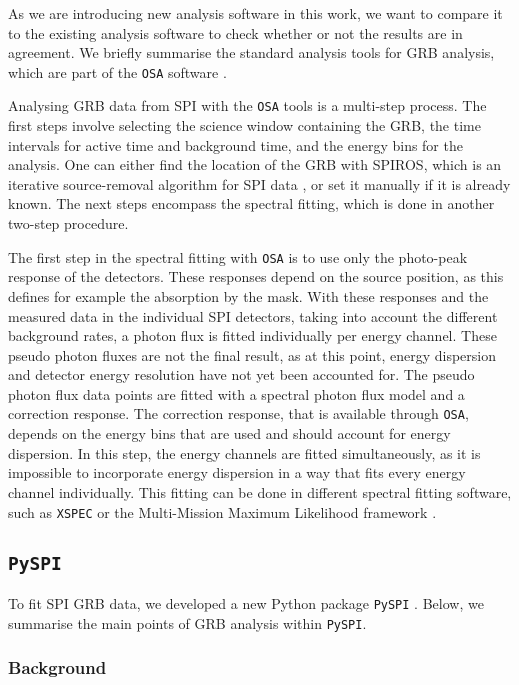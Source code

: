 \documentclass{aa}
\begin{document}
As we are introducing new analysis software in this work, we want to compare it to the existing analysis software to check whether or not the results are in agreement. We briefly summarise the standard analysis tools for GRB analysis, which are part of the {\tt OSA} software \citep{osa}.

Analysing GRB data from SPI with the {\tt OSA} tools is a multi-step process. The first steps involve selecting the science window containing the GRB, the time intervals for active time and background time, and the energy bins for the analysis. One can either find the location of the GRB with SPIROS, which is an iterative source-removal algorithm for SPI data \citep{Skinner-2003}, or set it manually if it is already known. The next steps encompass the spectral fitting, which is done in another two-step procedure.

The first step in the spectral fitting with {\tt OSA} is to use only the photo-peak response of the detectors. These responses depend on the source position, as this defines for example the absorption by the mask. With these responses and the measured data in the individual SPI detectors, taking into account the different background rates, a photon flux is fitted individually per energy channel. These pseudo photon fluxes are not the final result, as at this point, energy dispersion and detector energy resolution have not yet been accounted for.
The pseudo photon flux data points are fitted with a spectral photon flux model and a correction response. The correction response, that is available through {\tt OSA}, depends on the energy bins that are used and should account for energy dispersion. In this step, the energy channels are fitted simultaneously, as it is impossible to incorporate energy dispersion in a way that fits every energy channel individually. This fitting can be done in different spectral fitting software, such as {\tt XSPEC} \citep{xspec} or the Multi-Mission Maximum Likelihood framework \citep[3ML;][]{3ML}.


\subsection{{\tt PySPI}}
\label{pyspi}
To fit SPI GRB data, we developed a new Python package {\tt PySPI} \citep{joss}.
Below, we summarise the main points of GRB analysis within {\tt PySPI}.

\subsubsection{Background}
\end{document}
